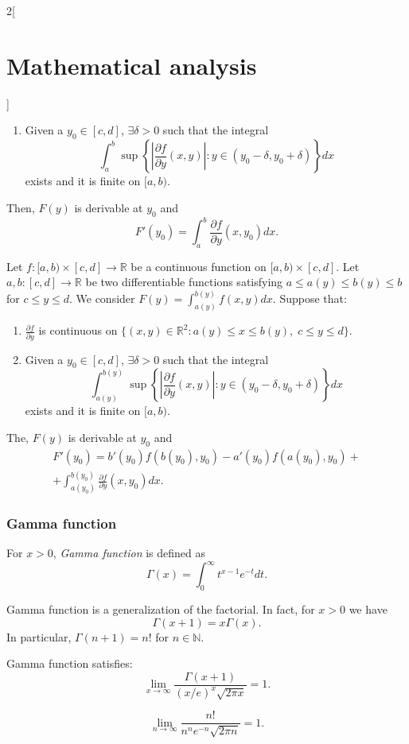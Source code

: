 \documentclass[class=article,crop=false]{standalone}
\begin{document}
\begin{multicols}{2}[\section{Mathematical analysis}]
\begin{theorem}
\begin{enumerate}
    \item Given a $y_0\in[c,d]$, $\exists\delta>0$ such that the integral $$\int_a^b\sup\left\{\left|\frac{\partial f}{\partial y}(x,y)\right|:y\in(y_0-\delta,y_0+\delta)\right\}dx$$ exists and it is finite on $[a,b)$.
\end{enumerate} 
Then, $F(y)$ is derivable at $y_0$ and $$F'(y_0)=\int_a^b\frac{\partial f}{\partial y}(x,y_0)dx.$$
\end{theorem}
\begin{theorem}
Let $f:[a,b)\times[c,d]\rightarrow\mathbb{R}$ be a continuous function on $[a,b)\times[c,d]$. Let $a,b:[c,d]\rightarrow\mathbb{R}$ be two differentiable functions satisfying $a\leq a(y)\leq b(y)\leq b$ for $c\leq y\leq d$. We consider $\displaystyle F(y)=\int_{a(y)}^{b(y)}f(x,y)dx$. Suppose that:
\begin{enumerate}
    \item $\displaystyle\frac{\partial f}{\partial y}$ is continuous on $\{(x,y)\in\mathbb{R}^2:a(y)\leq x\leq b(y),\; c\leq y\leq d\}$.
    \item Given a $y_0\in[c,d]$, $\exists\delta>0$ such that the integral $$\int_{a(y)}^{b(y)}\sup\left\{\left|\frac{\partial f}{\partial y}(x,y)\right|:y\in(y_0-\delta,y_0+\delta)\right\}dx$$ exists and it is finite on $[a,b)$.
\end{enumerate} 
The, $F(y)$ is derivable at $y_0$ and \begin{multline*}
    F'(y_0)=b'(y_0)f(b(y_0),y_0)-a'(y_0)f(a(y_0),y_0)+\\+\int_{a(y_0)}^{b(y_0)}\frac{\partial f}{\partial y}(x,y_0)dx.
\end{multline*}
\end{theorem}
\subsubsection{Gamma function}
\begin{definition}
For $x>0$, \textit{Gamma function} is defined as $$\Gamma(x)=\int_0^\infty t^{x-1}e^{-t}dt.$$
\end{definition}
\begin{theorem}
Gamma function is a generalization of the factorial. In fact, for $x>0$ we have $$\Gamma(x+1)=x\Gamma(x).$$ In particular, $\Gamma(n+1)=n!$ for $n\in\mathbb{N}$.
\end{theorem}
\begin{theorem}
Gamma function satisfies: $$\lim_{x\to\infty}\frac{\Gamma(x+1)}{(x/e)^x\sqrt{2\pi x}}=1.$$
\end{theorem}
\begin{corollary}
$$\lim_{n\to\infty}\frac{n!}{n^ne^{-n}\sqrt{2\pi n}}=1.$$
\end{corollary}

\end{multicols}
\end{document}
